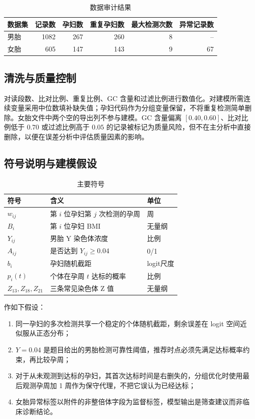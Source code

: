 \documentclass[UTF8,a4paper,12pt]{ctexart}
\begin{document}
\begin{table}[H]
\centering
\caption{数据审计结果}
\begin{tabular}{lrrrrr}
\toprule
数据集 & 记录数 & 孕妇数 & 重复孕妇数 & 最大检测次数 & 异常记录数\\
\midrule
男胎 & 1082 & 267 & 260 & 8 & --\\
女胎 & 605 & 147 & 143 & 9 & 67\\
\bottomrule
\end{tabular}
\end{table}

\subsection{清洗与质量控制}

对读段数、比对比例、重复比例、GC 含量和过滤比例进行数值化。对建模所需连续变量采用中位数填补缺失值；孕妇代码作为分组变量保留，不将重复检测简单删除。女胎文件中两个空的导出列不参与建模。GC 含量偏离 $[0.40,0.60]$、比对比例低于 $0.70$ 或过滤比例高于 $0.05$ 的记录被标记为质量风险，但不在主分析中直接删除，以便在误差分析中评估质量因素的影响。

\subsection{符号说明与建模假设}

\begin{table}[H]
\centering
\caption{主要符号}
\begin{tabular}{>{\centering\arraybackslash}p{}p{}p{}}
\toprule
符号 & 含义 & 单位\\
\midrule
$w_{ij}$ & 第 $i$ 位孕妇第 $j$ 次检测的孕周 & 周\\
$B_i$ & 第 $i$ 位孕妇 BMI & 无量纲\\
$Y_{ij}$ & 男胎 Y 染色体浓度 & 比例\\
$A_{ij}$ & 是否达到 $Y_{ij}\ge0.04$ & 0/1\\
$b_i$ & 孕妇随机截距 & logit尺度\\
$p_i(t)$ & 个体在孕周 $t$ 达标的概率 & 比例\\
$Z_{13},Z_{18},Z_{21}$ & 三条常见染色体 Z 值 & 无量纲\\
\bottomrule
\end{tabular}
\end{table}

作如下假设：
\begin{enumerate}[label=H\arabic*.,leftmargin=3em]
  \item 同一孕妇的多次检测共享一个稳定的个体随机截距，剩余误差在 logit 空间近似服从正态分布；
  \item $Y=0.04$ 是题目给出的男胎检测可靠性阈值，推荐时点必须先满足达标概率约束，再比较孕周；
  \item 对于从未观测到达标的孕妇，其首次达标时间是右删失的，分组优化时使用最后观测孕周加 1 周作为保守代理，不把它误认为已经达标；
  \item 女胎异常标签以附件的非整倍体字段为监督标签，模型输出是筛查建议而非临床诊断结论。
\end{enumerate}
\end{document}
